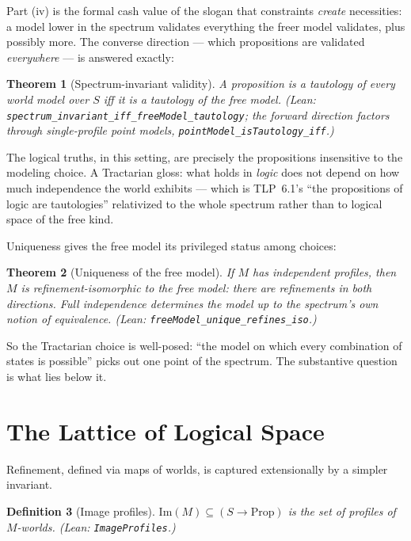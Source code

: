 \documentclass[10pt, letterpaper]{article}
\newtheorem{theorem}{Theorem}[section]
\newtheorem{definition}[theorem]{Definition}
\theoremstyle{remark}
\newcommand{\lean}[1]{\texttt{#1}}
\newcommand{\TLP}[1]{TLP~#1}
\begin{document}
Part (iv) is the formal cash value of the slogan that constraints
\emph{create} necessities: a model lower in the spectrum validates everything
the freer model validates, plus possibly more. The converse direction ---
which propositions are validated \emph{everywhere} --- is answered exactly:

\begin{theorem}[Spectrum-invariant validity]\label{thm:invariant}
A proposition is a tautology of every world model over $S$ iff it is a
tautology of the free model. (Lean:
\lean{spectrum\_invariant\_iff\_freeModel\_tautology}; the forward direction
factors through single-profile \emph{point models},
\lean{pointModel\_isTautology\_iff}.)
\end{theorem}

The logical truths, in this setting, are precisely the propositions
insensitive to the modeling choice. A Tractarian gloss: what holds in
\emph{logic} does not depend on how much independence the world exhibits ---
which is \TLP{6.1}'s ``the propositions of logic are tautologies'' relativized
to the whole spectrum rather than to logical space of the free kind.

Uniqueness gives the free model its privileged status among choices:

\begin{theorem}[Uniqueness of the free model]\label{thm:unique}
If $M$ has independent profiles, then $M$ is refinement-isomorphic to the
free model: there are refinements in both directions. Full independence
determines the model up to the spectrum's own notion of equivalence. (Lean:
\lean{freeModel\_unique\_refines\_iso}.)
\end{theorem}

So the Tractarian choice is well-posed: ``the model on which every
combination of states is possible'' picks out one point of the spectrum. The
substantive question is what lies below it.

\section{The Lattice of Logical Space}\label{sec:lattice}

Refinement, defined via maps of worlds, is captured extensionally by a
simpler invariant.

\begin{definition}[Image profiles]\label{def:image}
$\mathrm{Im}(M) \subseteq (S \to \mathrm{Prop})$ is the set of profiles of
$M$-worlds. (Lean: \lean{ImageProfiles}.)
\end{definition}
\end{document}
